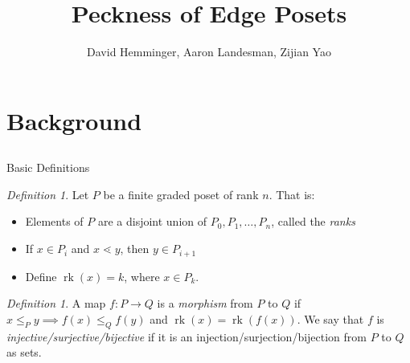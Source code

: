 \documentclass{beamer}
\title{Peckness of Edge Posets}
\author{David Hemminger\inst{1}, Aaron Landesman\inst{2}, Zijian Yao\inst{3}}
\institute[VFU] %
{
  \inst{1}
  Duke University
,
  \inst{2}
  Harvard University
  ,
  \inst{3}
  Brown University
}
\theoremstyle{remark}
\newtheorem{defn}[thm]{Definition}
\newcommand\rk{\operatorname{rk}}
\begin{document}
\begin{frame}
	\titlepage
\end{frame}


\section{Background}
\subsection{}




\begin{frame}{Basic Definitions}

\begin{defn}
Let $P$ be a finite graded poset of rank $n$. That is:
\begin{itemize}
\item Elements of $P$ are a disjoint union of $P_0,P_1,\ldots,P_n$, called the \textit{ranks}
\item If $x\in P_i$ and $x\lessdot y$, then $y\in P_{i+1}$
\item Define $\rk(x) = k$, where $x\in P_k$.
\end{itemize}
\end{defn}

\begin{defn}
A map $f\colon P\rightarrow Q$ is a \textit{morphism} from $P$ to $Q$ if $x\le_P y \implies f(x)\le_Q f(y)$ and $\rk(x) = \rk(f(x))$.  We say that $f$ is \textit{injective/surjective/bijective} if it is an injection/surjection/bijection from $P$ to $Q$ as sets.
\end{defn}
\end{frame}
\end{document}
